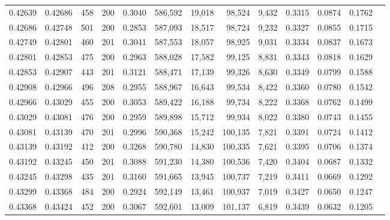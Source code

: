 \begin{tabular}{rrrrrrrrrrrrr}
0.42639 & 0.42686 &   458 & 200 &                                     0.3040 & 586,592 &  19,018 &  98,524 &   9,432 & 0.3315 & 0.0874 & 0.1762 \\
0.42686 & 0.42748 &   501 & 200 &                                     0.2853 & 587,093 &  18,517 &  98,724 &   9,232 & 0.3327 & 0.0855 & 0.1715 \\
0.42749 & 0.42801 &   460 & 201 &                                     0.3041 & 587,553 &  18,057 &  98,925 &   9,031 & 0.3334 & 0.0837 & 0.1673 \\
0.42801 & 0.42853 &   475 & 200 &                                     0.2963 & 588,028 &  17,582 &  99,125 &   8,831 & 0.3343 & 0.0818 & 0.1629 \\
0.42853 & 0.42907 &   443 & 201 &                                     0.3121 & 588,471 &  17,139 &  99,326 &   8,630 & 0.3349 & 0.0799 & 0.1588 \\
0.42908 & 0.42966 &   496 & 208 &                                     0.2955 & 588,967 &  16,643 &  99,534 &   8,422 & 0.3360 & 0.0780 & 0.1542 \\
0.42966 & 0.43029 &   455 & 200 &                                     0.3053 & 589,422 &  16,188 &  99,734 &   8,222 & 0.3368 & 0.0762 & 0.1499 \\
0.43029 & 0.43081 &   476 & 200 &                                     0.2959 & 589,898 &  15,712 &  99,934 &   8,022 & 0.3380 & 0.0743 & 0.1455 \\
0.43081 & 0.43139 &   470 & 201 &                                     0.2996 & 590,368 &  15,242 & 100,135 &   7,821 & 0.3391 & 0.0724 & 0.1412 \\
0.43139 & 0.43192 &   412 & 200 &                                     0.3268 & 590,780 &  14,830 & 100,335 &   7,621 & 0.3395 & 0.0706 & 0.1374 \\
0.43192 & 0.43245 &   450 & 201 &                                     0.3088 & 591,230 &  14,380 & 100,536 &   7,420 & 0.3404 & 0.0687 & 0.1332 \\
0.43245 & 0.43298 &   435 & 201 &                                     0.3160 & 591,665 &  13,945 & 100,737 &   7,219 & 0.3411 & 0.0669 & 0.1292 \\
0.43299 & 0.43368 &   484 & 200 &                                     0.2924 & 592,149 &  13,461 & 100,937 &   7,019 & 0.3427 & 0.0650 & 0.1247 \\
0.43368 & 0.43424 &   452 & 200 &                                     0.3067 & 592,601 &  13,009 & 101,137 &   6,819 & 0.3439 & 0.0632 & 0.1205 \\

\end{tabular}
